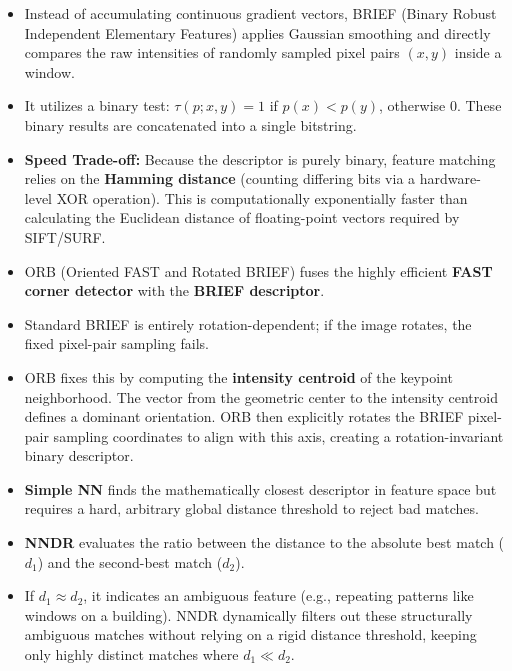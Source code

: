 {
\begin{itemize}
    \item Instead of accumulating continuous gradient vectors, BRIEF (Binary Robust Independent Elementary Features) applies Gaussian smoothing and directly compares the raw intensities of randomly sampled pixel pairs $(x,y)$ inside a window.
    \item It utilizes a binary test: $\tau(p; x,y) = 1$ if $p(x) < p(y)$, otherwise $0$. These binary results are concatenated into a single bitstring.
    \item \textbf{Speed Trade-off:} Because the descriptor is purely binary, feature matching relies on the \textbf{Hamming distance} (counting differing bits via a hardware-level XOR operation). This is computationally exponentially faster than calculating the Euclidean distance of floating-point vectors required by SIFT/SURF.
\end{itemize}}

{
\begin{itemize}
    \item ORB (Oriented FAST and Rotated BRIEF) fuses the highly efficient \textbf{FAST corner detector} with the \textbf{BRIEF descriptor}.
    \item Standard BRIEF is entirely rotation-dependent; if the image rotates, the fixed pixel-pair sampling fails.
    \item ORB fixes this by computing the \textbf{intensity centroid} of the keypoint neighborhood. The vector from the geometric center to the intensity centroid defines a dominant orientation. ORB then explicitly rotates the BRIEF pixel-pair sampling coordinates to align with this axis, creating a rotation-invariant binary descriptor.
\end{itemize}}

{
\begin{itemize}
    \item \textbf{Simple NN} finds the mathematically closest descriptor in feature space but requires a hard, arbitrary global distance threshold to reject bad matches.
    \item \textbf{NNDR} evaluates the ratio between the distance to the absolute best match ($d_1$) and the second-best match ($d_2$). 
    \item If $d_1 \approx d_2$, it indicates an ambiguous feature (e.g., repeating patterns like windows on a building). NNDR dynamically filters out these structurally ambiguous matches without relying on a rigid distance threshold, keeping only highly distinct matches where $d_1 \ll d_2$.
\end{itemize}}

